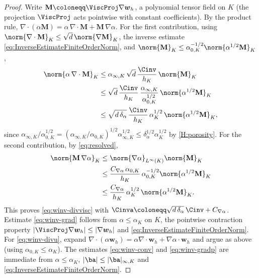 \begin{proof}
Write $\mathbf{M}\coloneqq\ViscProj\nabla\boldsymbol{w}_h$, a polynomial tensor field on
$K$ (the projection $\ViscProj$ acts pointwise with constant coefficients). By the product
rule, $\nabla\cdot(\alpha\mathbf{M})=\alpha\,\nabla\cdot\mathbf{M}
+\mathbf{M}\,\nabla\alpha$. For the first contribution, using
$\norm{\nabla\cdot\mathbf{M}}_K\le\sqrt{d}\,\norm{\nabla\mathbf{M}}_K$, the inverse
estimate \eqref{eq:InverseEstimateFiniteOrderNorm}, and
$\norm{\mathbf{M}}_K\le\alpha_{0,K}^{-1/2}\norm{\alpha^{1/2}\mathbf{M}}_K$,
\[
\begin{aligned}
  \norm{\alpha\,\nabla\cdot\mathbf{M}}_K
  &\le \alpha_{\infty,K}\,\sqrt{d}\,\frac{\Cinv}{h_K}\,\norm{\mathbf{M}}_K \\
  &\le \sqrt{d}\,\frac{\Cinv}{h_K}\,\frac{\alpha_{\infty,K}}{\alpha_{0,K}^{1/2}}\,\norm{\alpha^{1/2}\mathbf{M}}_K \\
  &\le \sqrt{d\,\delta_\alpha}\,\frac{\Cinv}{h_K}\,\alpha_K^{1/2}\,\norm{\alpha^{1/2}\mathbf{M}}_K,
\end{aligned}
\]
since $\alpha_{\infty,K}/\alpha_{0,K}^{1/2}
=(\alpha_{\infty,K}/\alpha_{0,K})^{1/2}\alpha_{\infty,K}^{1/2}
\le\delta_\alpha^{1/2}\alpha_K^{1/2}$ by \cref{H:porosity}. For the second contribution,
by \eqref{eq:resolved},
\[
\begin{aligned}
  \norm{\mathbf{M}\,\nabla\alpha}_K
  &\le \norm{\nabla\alpha}_{L^\infty(K)}\norm{\mathbf{M}}_K \\
  &\le \frac{C_{\nabla\alpha}\,\alpha_{0,K}}{h_K}\,
  \alpha_{0,K}^{-1/2}\norm{\alpha^{1/2}\mathbf{M}}_K \\
  &\le \frac{C_{\nabla\alpha}}{h_K}\,\alpha_K^{1/2}\,
  \norm{\alpha^{1/2}\mathbf{M}}_K .
\end{aligned}
\]
This proves \eqref{eq:winv-divvisc} with
$\Cinva\coloneqq\sqrt{d\,\delta_\alpha}\,\Cinv+C_{\nabla\alpha}$. Estimate
\eqref{eq:winv-grad} follows from $\alpha\le\alpha_K$ on $K$, the pointwise contraction
property $|\ViscProj\nabla\boldsymbol{w}_h|\le|\nabla\boldsymbol{w}_h|$ and
\eqref{eq:InverseEstimateFiniteOrderNorm}. For \eqref{eq:winv-divu}, expand
$\nabla\cdot(\alpha\boldsymbol{w}_h)=\alpha\nabla\cdot\boldsymbol{w}_h
+\nabla\alpha\cdot\boldsymbol{w}_h$ and argue as above (using $\alpha_{0,K}\le\alpha_K$).
The estimates \eqref{eq:winv-conv} and \eqref{eq:winv-gradp} are immediate from
$\alpha\le\alpha_K$, $|\ba|\le|\ba|_{\infty,K}$ and \eqref{eq:InverseEstimateFiniteOrderNorm}.
\end{proof}

